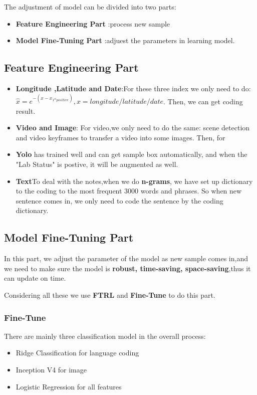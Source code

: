 \documentclass[12pt]{article}
\begin{document}
The adjustment of model can be divided into two parts:
\begin{itemize}
	\item \textbf{Feature Engineering Part} :process new sample
	\item \textbf{Model Fine-Tuning Part} :adjuest the parameters in learning model.
\end{itemize}
\subsection{Feature Engineering Part}
\begin{itemize}
	\item \textbf{Longitude ,Latitude and Date}:For these three index we only need to do: $\hat{x}=e^{-(x-x_{1^{st}positive})},x=longitude/latitude/date$. Then, we can get coding result.
	\item \textbf{Video and Image}: For video,we only need to do the same: scene detection and video keyframes to transfer a video into some images. Then, for
	\item \textbf{Yolo} has trained well and can get sample box automatically, and when the "Lab Status" is postive, it will be augmented as well.
	\item \textbf{Text}To deal with the notes,when we do \textbf{n-grams}, we have set up dictionary to the coding to the most frequent 3000 words and phrases. So when new sentence comes in, we only need to code the sentence by the coding dictionary.
\end{itemize}


\subsection{Model Fine-Tuning Part}
In this part, we adjust the parameter of the model as new sample comes in,and we need to make sure the model is \textbf{robust, time-saving, space-saving},thus it can update on time.

Considering all these we use \textbf{FTRL} and \textbf{Fine-Tune} to do this part.
 
\subsubsection{Fine-Tune}
There are mainly three classification model in the overall process:
\begin{itemize}
	\item Ridge Classification for language coding
	\item Inception V4 for image
	\item Logistic Regression for all features
\end{itemize}
\end{document}
